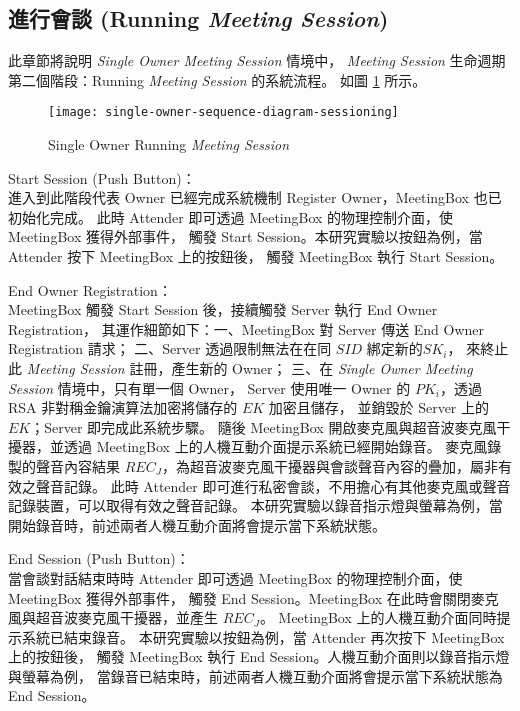 \subsection{進行會談 (Running {\it Meeting Session})}

    此章節將說明 {\it Single Owner Meeting Session} 情境中，
{\it Meeting Session} 生命週期第二個階段：Running {\it Meeting Session} 的系統流程。
如圖 \ref{fig.s-o-sessioning} 所示。

\begin{figure}[H]
    \centering
    \texttt{[image: single-owner-sequence-diagram-sessioning]}
    \caption{Single Owner Running {\it Meeting Session}}
    \label{fig.s-o-sessioning}
\end{figure}

\begin{steps}
    \item Start Session (Push Button)：\\
        進入到此階段代表 Owner 已經完成系統機制 Register Owner，MeetingBox 也已初始化完成。
        此時 Attender 即可透過 MeetingBox 的物理控制介面，使 MeetingBox 獲得外部事件，
        觸發 Start Session。本研究實驗以按鈕為例，當 Attender 按下 MeetingBox 上的按鈕後，
        觸發 MeetingBox 執行 Start Session。

    \item End Owner Registration：\\
        MeetingBox 觸發 Start Session 後，接續觸發 Server 執行 End Owner Registration，
        其運作細節如下：一、MeetingBox 對 Server 傳送 End Owner Registration 請求；
        二、Server 透過限制無法在在同 $SID$ 綁定新的$SK_{i}$，
        來終止此 {\it Meeting Session} 註冊，產生新的 Owner；
        三、在 {\it Single Owner Meeting Session} 情境中，只有單一個 Owner，
        Server 使用唯一 Owner 的 $PK_{i}$，透過 RSA 非對稱金鑰演算法加密將儲存的 $EK$ 加密且儲存，
        並銷毀於 Server 上的 $EK$；Server 即完成此系統步驟。
        隨後 MeetingBox 開啟麥克風與超音波麥克風干擾器，並透過 MeetingBox 上的人機互動介面提示系統已經開始錄音。
        麥克風錄製的聲音內容結果 $REC_{J}$，為超音波麥克風干擾器與會談聲音內容的疊加，屬非有效之聲音記錄。
        此時 Attender 即可進行私密會談，不用擔心有其他麥克風或聲音記錄裝置，可以取得有效之聲音記錄。
        本研究實驗以錄音指示燈與螢幕為例，當開始錄音時，前述兩者人機互動介面將會提示當下系統狀態。

    \item End Session (Push Button)：\\
        當會談對話結束時時 Attender 即可透過 MeetingBox 的物理控制介面，使 MeetingBox 獲得外部事件，
        觸發 End Session。MeetingBox 在此時會關閉麥克風與超音波麥克風干擾器，並產生 $REC_{J}$。
        MeetingBox 上的人機互動介面同時提示系統已結束錄音。
        本研究實驗以按鈕為例，當 Attender 再次按下 MeetingBox 上的按鈕後，
        觸發 MeetingBox 執行 End Session。人機互動介面則以錄音指示燈與螢幕為例，
        當錄音已結束時，前述兩者人機互動介面將會提示當下系統狀態為 End Session。


\end{steps}
